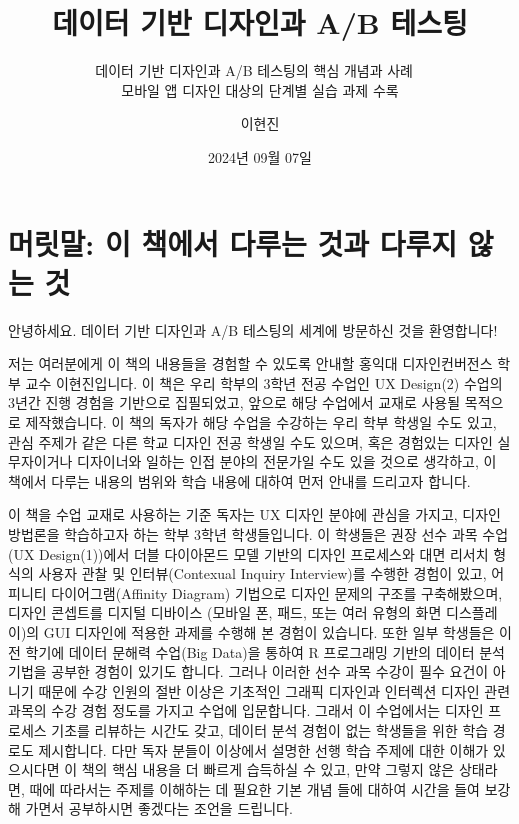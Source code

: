 \documentclass[
  letterpaper,
]{book}
\title{데이터 기반 디자인과 A/B 테스팅}
\subtitle{데이터 기반 디자인과 A/B 테스팅의 핵심 개념과 사례 ~\\
모바일 앱 디자인 대상의 단계별 실습 과제 수록}
\author{이현진}
\date{2024년 09월 07일}
\renewcommand*\contentsname{목차}
\newcommand\contentsname{목차}
\begin{document}
\frontmatter
\maketitle

\renewcommand*\contentsname{목차}
{
\hypersetup{linkcolor=}
\setcounter{tocdepth}{1}
\tableofcontents
}

\mainmatter
{}

\chapter*{머릿말: 이 책에서 다루는 것과 다루지 않는
것}\label{uxba38uxb9bfuxb9d0-uxc774-uxcc45uxc5d0uxc11c-uxb2e4uxb8e8uxb294-uxac83uxacfc-uxb2e4uxb8e8uxc9c0-uxc54auxb294-uxac83}


안녕하세요. 데이터 기반 디자인과 A/B 테스팅의 세계에 방문하신 것을
환영합니다!

저는 여러분에게 이 책의 내용들을 경험할 수 있도록 안내할 홍익대
디자인컨버전스 학부 교수 이현진입니다. 이 책은 우리 학부의 3학년 전공
수업인 UX Design(2) 수업의 3년간 진행 경험을 기반으로 집필되었고, 앞으로
해당 수업에서 교재로 사용될 목적으로 제작했습니다. 이 책의 독자가 해당
수업을 수강하는 우리 학부 학생일 수도 있고, 관심 주제가 같은 다른 학교
디자인 전공 학생일 수도 있으며, 혹은 경험있는 디자인 실무자이거나
디자이너와 일하는 인접 분야의 전문가일 수도 있을 것으로 생각하고, 이
책에서 다루는 내용의 범위와 학습 내용에 대하여 먼저 안내를 드리고자
합니다.

이 책을 수업 교재로 사용하는 기준 독자는 UX 디자인 분야에 관심을 가지고,
디자인 방법론을 학습하고자 하는 학부 3학년 학생들입니다. 이 학생들은
권장 선수 과목 수업(UX Design(1))에서 더블 다이아몬드 모델 기반의 디자인
프로세스와 대면 리서치 형식의 사용자 관찰 및 인터뷰(Contexual Inquiry
Interview)를 수행한 경험이 있고, 어피니티 다이어그램(Affinity Diagram)
기법으로 디자인 문제의 구조를 구축해봤으며, 디자인 콘셉트를 디지털
디바이스 (모바일 폰, 패드, 또는 여러 유형의 화면 디스플레이)의 GUI
디자인에 적용한 과제를 수행해 본 경험이 있습니다. 또한 일부 학생들은
이전 학기에 데이터 문해력 수업(Big Data)을 통하여 R 프로그래밍 기반의
데이터 분석 기법을 공부한 경험이 있기도 합니다. 그러나 이러한 선수 과목
수강이 필수 요건이 아니기 때문에 수강 인원의 절반 이상은 기초적인 그래픽
디자인과 인터렉션 디자인 관련 과목의 수강 경험 정도를 가지고 수업에
입문합니다. 그래서 이 수업에서는 디자인 프로세스 기초를 리뷰하는 시간도
갖고, 데이터 분석 경험이 없는 학생들을 위한 학습 경로도 제시합니다. 다만
독자 분들이 이상에서 설명한 선행 학습 주제에 대한 이해가 있으시다면 이
책의 핵심 내용을 더 빠르게 습득하실 수 있고, 만약 그렇지 않은 상태라면,
때에 따라서는 주제를 이해하는 데 필요한 기본 개념 들에 대하여 시간을
들여 보강해 가면서 공부하시면 좋겠다는 조언을 드립니다.
\end{document}
